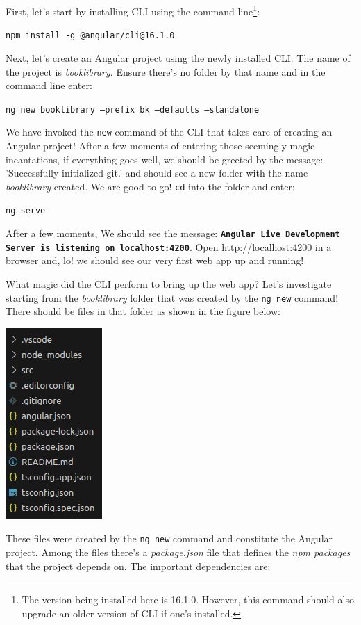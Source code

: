 \documentclass{report}
\begin{document}
First, let's start by installing CLI using the command line\footnote{The version being installed here is 16.1.0. However, this command should also upgrade an older version of CLI if one's installed.}:

\texttt{npm install -g @angular/cli@16.1.0}

Next, let's create an Angular project using the newly installed CLI. The name of the project is \textsl{booklibrary}. Ensure there's no folder by that name and in the command line enter: 

\texttt{ng new booklibrary --prefix bk --defaults --standalone}

We have invoked the \verb|new| command of the CLI that takes care of creating an Angular project! After a few moments of entering those seemingly magic incantations, if everything goes well, we should be greeted by the message: 'Successfully initialized git.' and should see a new folder with the name \textsl{booklibrary} created. We are good to go! \verb|cd| into the folder and enter:

\texttt{ng serve}

After a few moments, We should see the message: \textbf{\texttt{Angular Live Development Server is listening on localhost:4200}}. Open \url{http://localhost:4200} in a browser and, lo! we should see our very first web app up and running!

What magic did the CLI perform to bring up the web app? Let's investigate starting from the \textsl{booklibrary} folder that was created by the \verb|ng new| command! There should be files in that folder as shown in the figure below:

\includegraphics[scale=0.5]{project-structure}

These files were created by the \verb|ng new| command and constitute the Angular project. Among the files there's a \textsl{package.json} file that defines the \textsl{npm packages} that the project depends on. The important dependencies are:
\end{document}
